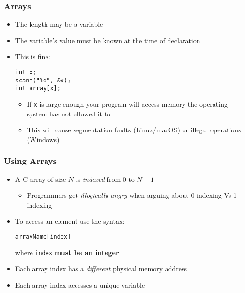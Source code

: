 \documentclass[14pt]{beamer}
\begin{document}
\begin{frame}[fragile]
\frametitle{Arrays}
\begin{itemize}
\item The length may be a variable
\item The variable's value must be known at the time of declaration
\item \underline{\href{https://i.kym-cdn.com/photos/images/newsfeed/001/401/347/312.jpg}{This is fine}}:
\begin{lstlisting}[style=CStyle]
int x;
scanf("%d", &x);
int array[x];
\end{lstlisting}
\pause
\begin{itemize}
\item If \texttt{x} is large enough your program will access memory the operating system has not allowed it to
\pause
\item This will cause segmentation faults (Linux/macOS) or illegal operations (Windows)
\end{itemize}
\end{itemize}
\end{frame}

\begin{frame}[fragile]
\frametitle{Using Arrays}
\begin{itemize}
\item A C array of size $N$ is \textit{indexed} from $0$ to $N-1$
	\begin{itemize}
		\item Programmers get \textit{illogically angry} when arguing about 0-indexing Vs 1-indexing
	\end{itemize}
\item To access an element use the syntax:\\
\begin{lstlisting}[style=CStyle]
arrayName[index]
\end{lstlisting}
where \texttt{index} \textbf{must be an integer}
\item Each array index has a \textit{different} physical memory address
\item Each array index accesses a unique variable
\end{itemize}
\end{frame}
\end{document}
